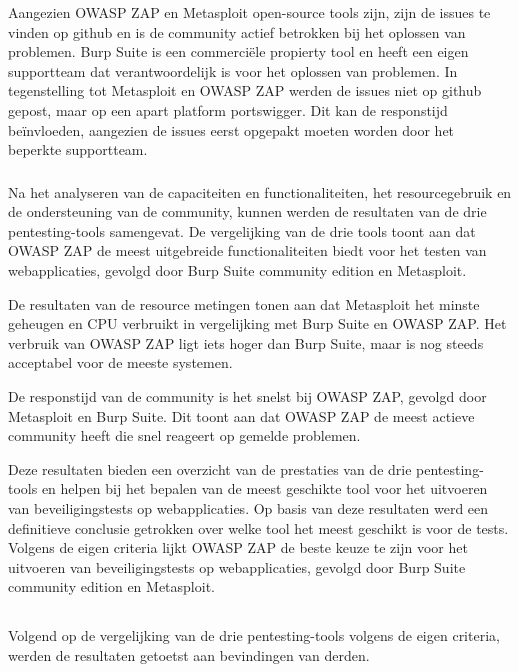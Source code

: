 Aangezien OWASP ZAP en Metasploit open-source tools zijn, zijn de issues te vinden op github en is de community actief
betrokken bij het oplossen van problemen. Burp Suite is een commerciële propierty tool en heeft een eigen supportteam dat 
verantwoordelijk is voor het oplossen van problemen. In tegenstelling tot Metasploit en OWASP ZAP werden de issues niet 
op github gepost, maar op een apart platform portswigger. Dit kan de responstijd beïnvloeden, 
aangezien de issues eerst opgepakt moeten worden door het beperkte supportteam.

\subsubsection{}
Na het analyseren van de capaciteiten en functionaliteiten, het resourcegebruik en de ondersteuning van de community,
kunnen werden de resultaten van de drie pentesting-tools samengevat. De vergelijking van de drie tools toont aan dat
OWASP ZAP de meest uitgebreide functionaliteiten biedt voor het testen van webapplicaties, gevolgd door Burp Suite 
community edition en Metasploit. 

De resultaten van de resource metingen tonen aan dat Metasploit het minste 
geheugen en CPU verbruikt in vergelijking met Burp Suite en OWASP ZAP. Het verbruik van OWASP ZAP ligt iets hoger dan 
Burp Suite, maar is nog steeds acceptabel voor de meeste systemen. 

De responstijd van de community is het snelst bij OWASP ZAP, 
gevolgd door Metasploit en Burp Suite. Dit toont aan dat OWASP ZAP de meest actieve community heeft die snel reageert op 
gemelde problemen.

Deze resultaten bieden een overzicht van de prestaties van de drie pentesting-tools en helpen bij het bepalen van de 
meest geschikte tool voor het uitvoeren van beveiligingstests op webapplicaties. Op basis van deze resultaten werd een 
definitieve conclusie getrokken over welke tool het meest geschikt is voor de tests. Volgens de eigen criteria 
lijkt OWASP ZAP de beste keuze te zijn voor het uitvoeren van beveiligingstests op webapplicaties, gevolgd door Burp Suite 
community edition en Metasploit. 

\subsection{}
Volgend op de vergelijking van de drie pentesting-tools volgens de eigen criteria, werden de resultaten getoetst aan bevindingen van 
derden.

